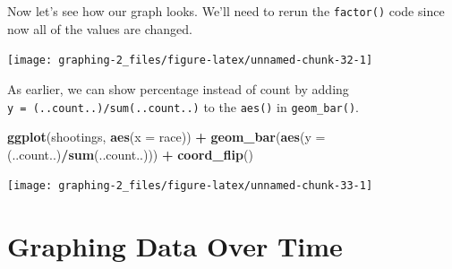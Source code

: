 \documentclass[
  12pt,
]{book}
\newenvironment{Shaded}{\begin{snugshade}}{\end{snugshade}}
\newcommand{\DataTypeTok}[1]{\textcolor[rgb]{0.13,0.29,0.53}{#1}}
\newcommand{\KeywordTok}[1]{\textcolor[rgb]{0.13,0.29,0.53}{\textbf{#1}}}
\newcommand{\NormalTok}[1]{#1}
\newcommand{\OperatorTok}[1]{\textcolor[rgb]{0.81,0.36,0.00}{\textbf{#1}}}
\newcommand{\OtherTok}[1]{\textcolor[rgb]{0.56,0.35,0.01}{#1}}
\newcommand{\StringTok}[1]{\textcolor[rgb]{0.31,0.60,0.02}{#1}}
\begin{document}
Now let's see how our graph looks. We'll need to rerun the \texttt{factor()} code since now all of the values are changed.

\begin{Shaded}
\end{Shaded}

\begin{center}\texttt{[image: graphing-2\_files/figure-latex/unnamed-chunk-32-1]} \end{center}

As earlier, we can show percentage instead of count by adding \texttt{y\ =\ (..count..)/sum(..count..)} to the \texttt{aes()} in \texttt{geom\_bar()}.

\begin{Shaded}
\begin{Highlighting}[]
\KeywordTok{ggplot}\NormalTok{(shootings, }\KeywordTok{aes}\NormalTok{(}\DataTypeTok{x =}\NormalTok{ race)) }\OperatorTok{+}\StringTok{ }
\StringTok{  }\KeywordTok{geom\_bar}\NormalTok{(}\KeywordTok{aes}\NormalTok{(}\DataTypeTok{y =}\NormalTok{ (..count..)}\OperatorTok{/}\KeywordTok{sum}\NormalTok{(..count..))) }\OperatorTok{+}
\StringTok{  }\KeywordTok{coord\_flip}\NormalTok{() }
\end{Highlighting}
\end{Shaded}

\begin{center}\texttt{[image: graphing-2\_files/figure-latex/unnamed-chunk-33-1]} \end{center}

\hypertarget{graphing-data-over-time}{%
\section{Graphing Data Over Time}\label{graphing-data-over-time}}
\end{document}
